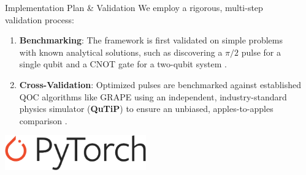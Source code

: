 \documentclass[final]{beamer}
\newlength{\sepwidth}
\newlength{\colwidth}
\newcommand{\separatorcolumn}{\begin{column}{\sepwidth}\end{column}}
\begin{document}
\begin{frame}[t]
\begin{columns}[t]
\begin{column}{\colwidth}
\begin{block}{Implementation Plan \& Validation}
    We employ a rigorous, multi-step validation process:
    \begin{enumerate}
        \item \textbf{Benchmarking}: The framework is first validated on simple problems with known analytical solutions, such as discovering a $\pi/2$ pulse for a single qubit and a CNOT gate for a two-qubit system \cite{Berni2025Brief}.
        \item \textbf{Cross-Validation}: Optimized pulses are benchmarked against established QOC algorithms like GRAPE using an independent, industry-standard physics simulator (\textbf{QuTiP}) to ensure an unbiased, apples-to-apples comparison \cite{Johansson2012, Berni2025Brief}.
    \end{enumerate}
    \vspace{1em}
    \centering
    \includegraphics[height=1.5cm]{img/Pytorch_logo.png} \hspace{5em} 
     \hspace{5em}
     \hspace{5em}
\end{block}
\end{column}

\separatorcolumn
\end{columns}
\end{frame}
\end{document}
